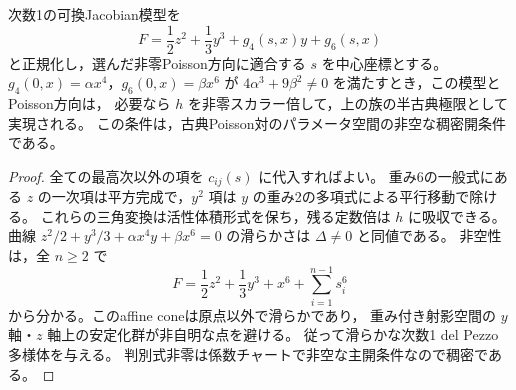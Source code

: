 \begin{proposition}\label{prop:degree-one-elliptic-semiclassical-coverage}
次数1の可換Jacobian模型を
\[
 F=\frac12z^2+\frac13y^3+g_4(s,x)y+g_6(s,x)
\]
と正規化し，選んだ非零Poisson方向に適合する $s$ を中心座標とする。
$g_4(0,x)=\alpha x^4$，$g_6(0,x)=\beta x^6$ が
$4\alpha^3+9\beta^2\ne0$ を満たすとき，この模型とPoisson方向は，
必要なら $h$ を非零スカラー倍して，上の族の半古典極限として実現される。
この条件は，古典Poisson対のパラメータ空間の非空な稠密開条件である。
\end{proposition}
\begin{proof}
全ての最高次以外の項を $c_{ij}(s)$ に代入すればよい。
重み6の一般式にある $z$ の一次項は平方完成で，$y^2$ 項は
$y$ の重み2の多項式による平行移動で除ける。
これらの三角変換は活性体積形式を保ち，残る定数倍は $h$ に吸収できる。
曲線 $z^2/2+y^3/3+\alpha x^4y+\beta x^6=0$ の滑らかさは
$\Delta\ne0$ と同値である。
非空性は，全 $n\ge2$ で
\[
 F=\frac12z^2+\frac13y^3+x^6+\sum_{i=1}^{n-1}s_i^6
\]
から分かる。このaffine coneは原点以外で滑らかであり，
重み付き射影空間の $y$ 軸・$z$ 軸上の安定化群が非自明な点を避ける。
従って滑らかな次数1 del Pezzo多様体を与える。
判別式非零は係数チャートで非空な主開条件なので稠密である。
\end{proof}
